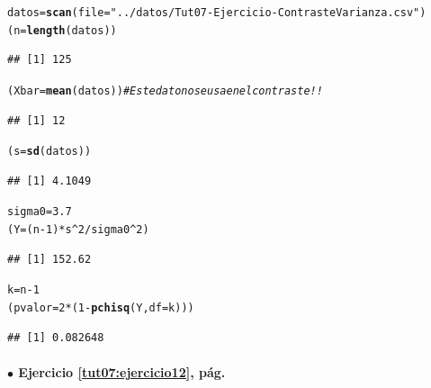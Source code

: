 \documentclass[10pt,a4paper]{article}\usepackage[]{graphicx}\usepackage[]{color}
\makeatletter
\newcommand{\hlnum}[1]{\textcolor[rgb]{0.686,0.059,0.569}{#1}}%
\newcommand{\hlstr}[1]{\textcolor[rgb]{0.192,0.494,0.8}{#1}}%
\newcommand{\hlcom}[1]{\textcolor[rgb]{0.678,0.584,0.686}{\textit{#1}}}%
\newcommand{\hlopt}[1]{\textcolor[rgb]{0,0,0}{#1}}%
\newcommand{\hlstd}[1]{\textcolor[rgb]{0.345,0.345,0.345}{#1}}%
\newcommand{\hlkwb}[1]{\textcolor[rgb]{0.69,0.353,0.396}{#1}}%
\newcommand{\hlkwc}[1]{\textcolor[rgb]{0.333,0.667,0.333}{#1}}%
\newcommand{\hlkwd}[1]{\textcolor[rgb]{0.737,0.353,0.396}{\textbf{#1}}}%
\newenvironment{kframe}{%
 \def\at@end@of@kframe{}%
 \ifinner\ifhmode%
  \def\at@end@of@kframe{\end{minipage}}%
  \begin{minipage}{\columnwidth}%
 \fi\fi%
 \def\FrameCommand##1{\hskip\@totalleftmargin \hskip-\fboxsep
 \colorbox{shadecolor}{##1}\hskip-\fboxsep
     \hskip-\linewidth \hskip-\@totalleftmargin \hskip\columnwidth}%
 \MakeFramed {\advance\hsize-\width
   \@totalleftmargin\z@ \linewidth\hsize
   \@setminipage}}%
 {\par\unskip\endMakeFramed%
 \at@end@of@kframe}
\newenvironment{knitrout}{}{} %
\newcounter {cont01}
\makeatother
\begin{document}
\begin{knitrout}
\color{fgcolor}\begin{kframe}
\begin{alltt}
\hlstd{datos} \hlkwb{=} \hlkwd{scan}\hlstd{(}\hlkwc{file} \hlstd{=} \hlstr{"../datos/Tut07-Ejercicio-ContrasteVarianza.csv"}\hlstd{)}
\hlstd{(n} \hlkwb{=} \hlkwd{length}\hlstd{(datos))}
\end{alltt}
\begin{verbatim}
## [1] 125
\end{verbatim}
\begin{alltt}
\hlstd{(Xbar} \hlkwb{=} \hlkwd{mean}\hlstd{(datos))} \hlcom{# Este dato no se usa en el contraste!!}
\end{alltt}
\begin{verbatim}
## [1] 12
\end{verbatim}
\begin{alltt}
\hlstd{(s} \hlkwb{=} \hlkwd{sd}\hlstd{(datos))}
\end{alltt}
\begin{verbatim}
## [1] 4.1049
\end{verbatim}
\begin{alltt}
\hlstd{sigma0} \hlkwb{=} \hlnum{3.7}
\hlstd{(Y} \hlkwb{=} \hlstd{(n}\hlopt{-}\hlnum{1}\hlstd{)} \hlopt{*} \hlstd{s}\hlopt{^}\hlnum{2} \hlopt{/} \hlstd{sigma0}\hlopt{^}\hlnum{2}\hlstd{)}
\end{alltt}
\begin{verbatim}
## [1] 152.62
\end{verbatim}
\begin{alltt}
\hlstd{k} \hlkwb{=} \hlstd{n} \hlopt{-} \hlnum{1}
\hlstd{(pvalor} \hlkwb{=} \hlnum{2}\hlopt{*}\hlstd{(}\hlnum{1} \hlopt{-} \hlkwd{pchisq}\hlstd{(Y,} \hlkwc{df} \hlstd{= k)))}
\end{alltt}
\begin{verbatim}
## [1] 0.082648
\end{verbatim}
\end{kframe}
\end{knitrout}

%


\paragraph{\bf $\bullet$ Ejercicio \ref{tut07:ejercicio12}, pág. \pageref{tut07:ejercicio12}}
\label{tut07:ejercicio12:sol}\quad\\
\end{document}

